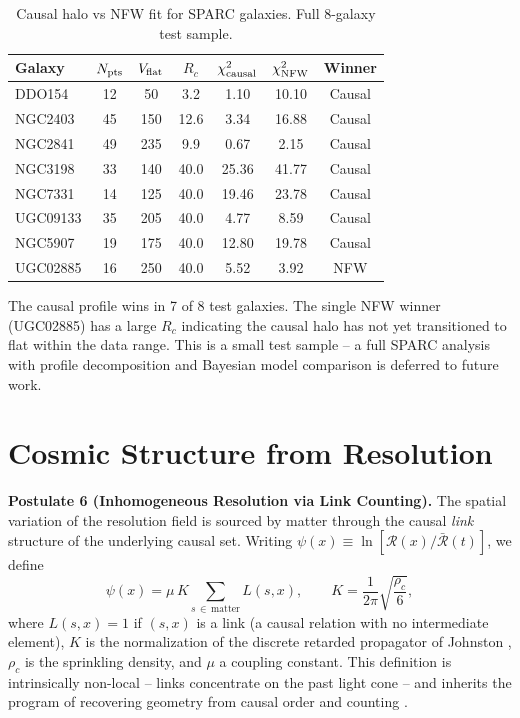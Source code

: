 \documentclass[12pt]{article}
\begin{document}
\begin{table}[H]
\centering
\caption{Causal halo vs NFW fit for SPARC galaxies. Full 8-galaxy test sample.}
\begin{tabular}{lcccccc}
\hline
Galaxy & $N_{\rm pts}$ & $V_{\rm flat}$ & $R_c$ & $\chi^2_{\rm causal}$ & $\chi^2_{\rm NFW}$ & Winner \\
\hline
DDO154 & 12 & 50 & 3.2 & 1.10 & 10.10 & Causal \\
NGC2403 & 45 & 150 & 12.6 & 3.34 & 16.88 & Causal \\
NGC2841 & 49 & 235 & 9.9 & 0.67 & 2.15 & Causal \\
NGC3198 & 33 & 140 & 40.0 & 25.36 & 41.77 & Causal \\
NGC7331 & 14 & 125 & 40.0 & 19.46 & 23.78 & Causal \\
UGC09133 & 35 & 205 & 40.0 & 4.77 & 8.59 & Causal \\
NGC5907 & 19 & 175 & 40.0 & 12.80 & 19.78 & Causal \\
UGC02885 & 16 & 250 & 40.0 & 5.52 & 3.92 & NFW \\
\hline
\end{tabular}
\end{table}

The causal profile wins in 7 of 8 test galaxies. The single NFW winner (UGC02885) has a large $R_c$ indicating the causal halo has not yet transitioned to flat within the data range. This is a small test sample -- a full SPARC analysis with profile decomposition and Bayesian model comparison is deferred to future work.

\section{Cosmic Structure from Resolution}
\label{sec:structure}

{\bf Postulate 6 (Inhomogeneous Resolution via Link Counting).} The spatial variation of the resolution field is sourced by matter through the causal \emph{link} structure of the underlying causal set. Writing $\psi(x) \equiv \ln[\mathcal{R}(x)/\bar{\mathcal{R}}(t)]$, we define
\begin{equation}
\psi(x) = \mu \, K \sum_{s \,\in\, \mathrm{matter}} L(s, x),
\qquad K = \frac{1}{2\pi}\sqrt{\frac{\rho_c}{6}},
\label{eq:post6-links}
\end{equation}
where $L(s,x)=1$ if $(s,x)$ is a link (a causal relation with no intermediate element), $K$ is the normalization of the discrete retarded propagator of Johnston \citep{johnston2008}, $\rho_c$ is the sprinkling density, and $\mu$ a coupling constant. This definition is intrinsically non-local -- links concentrate on the past light cone \citep{myrheim1978,bombelli1987} -- and inherits the program of recovering geometry from causal order and counting \citep{benincasa2010}.
\end{document}
